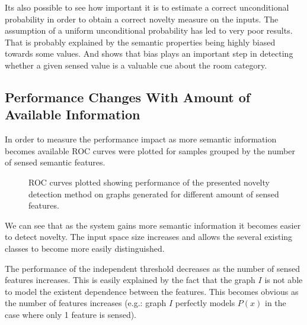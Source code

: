 \documentclass[runningheads,a4paper]{llncs}
\begin{document}
Its also possible to see how important it is to estimate a correct unconditional
probability in order to obtain a correct novelty measure on the inputs.
The assumption of a uniform unconditional probability has led to very poor results.
That is probably explained by the semantic properties being highly
biased towards some values. And shows that bias plays an important step
in detecting whether a given sensed value is a valuable cue about the room category.



\subsection{Performance Changes With Amount of Available Information}
In order to measure the performance impact as more semantic information becomes
available ROC curves were plotted for samples grouped by the number of sensed
semantic features.

\begin{figure}[h]
\centering

\qquad
{}

\qquad
{}

\caption{\label{fig:synthetic-roc-breakdown}ROC curves plotted showing performance of the
         presented novelty detection method on graphs generated for different amount of
         sensed features.}
\end{figure}

We can see that as the system gains more semantic information it becomes easier
to detect novelty. The input space size increases and allows the several existing
classes to become more easily distinguished.

The performance of the independent threshold decreases as the number of sensed
features increases. This is easily explained by the fact that the graph $I$ is not
able to model the existent dependence between the features. This becomes obvious
as the number of features increases (e.g.: graph $I$ perfectly models $P(x)$ in the
case where only 1 feature is sensed).
\end{document}
